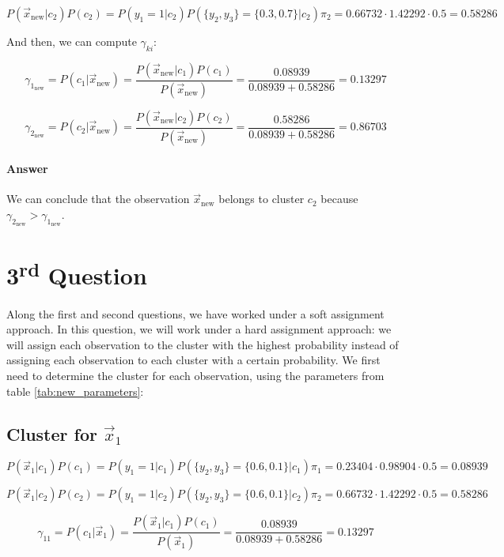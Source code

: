 \documentclass{article}
\begin{document}
\[ P(\vec{x}_{\text{new}} | c_2) P(c_2) = P(y_1 = 1 | c_2) P(\{y_2, y_3\}  = \{0.3, 0.7\} | c_2) \pi_2 = 0.66732 \cdot 1.42292 \cdot 0.5 = 0.58286 \]

And then, we can compute $\gamma_{ki}$:

\[ \gamma_{1_{\text{new}}} = P(c_1| \vec{x}_{\text{new}}) = \frac{P(\vec{x}_{\text{new}} | c_1) P(c_1)}{P(\vec{x}_{\text{new}})} = \frac{0.08939}{0.08939 + 0.58286} = 0.13297 \]

\[ \gamma_{2_{\text{new}}} = P(c_2| \vec{x}_{\text{new}}) = \frac{P(\vec{x}_{\text{new}} | c_2) P(c_2)}{P(\vec{x}_{\text{new}})} = \frac{0.58286}{0.08939 + 0.58286} = 0.86703 \]

\paragraph{Answer} We can conclude that the observation $\vec{x}_{\text{new}}$ belongs to cluster $c_2$ because $\gamma_{2_{\text{new}}} > \gamma_{1_{\text{new}}}$.

\newpage

\section*{3\textsuperscript{rd} Question}

Along the first and second questions, we have worked under a soft assignment approach. In this question, we will work under a hard assignment approach: we will assign each observation to the cluster with the highest probability instead of assigning each observation to each cluster with a certain probability.
We first need to determine the cluster for each observation, using the parameters from table \ref{tab:new_parameters}:

\subsection*{Cluster for $\vec{x}_1$}

\[ P(\vec{x}_1 | c_1) P(c_1) = P(y_1 = 1 | c_1) P(\{y_2, y_3\}  = \{0.6, 0.1\} | c_1) \pi_1 = 0.23404 \cdot 0.98904 \cdot 0.5 = 0.08939 \]

\[ P(\vec{x}_1 | c_2) P(c_2) = P(y_1 = 1 | c_2) P(\{y_2, y_3\}  = \{0.6, 0.1\} | c_2) \pi_2 = 0.66732 \cdot 1.42292 \cdot 0.5 = 0.58286 \]

\[ \gamma_{11} = P(c_1| \vec{x}_1) = \frac{P(\vec{x}_1 | c_1) P(c_1)}{P(\vec{x}_1)} = \frac{0.08939}{0.08939 + 0.58286} = 0.13297 \]
\end{document}
